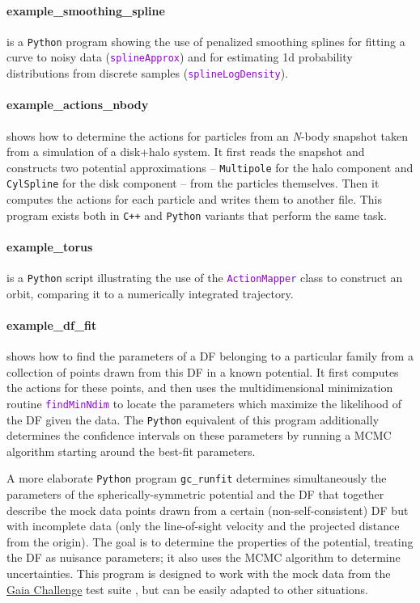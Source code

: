 \documentclass[12pt]{article}
\newcommand{\Nbody}{\textsl{N}-body\xspace}
\newcommand{\Cpp}  {\texttt{C++}\xspace}
\newcommand{\Python}{\texttt{Python}\xspace}
\newcommand{\ttt}[1]{\textcolor{darkviolet}{\texttt{#1}}}
\newcommand{\ppp}[1]{\textcolor{darkolive} {\texttt{#1}}}
\begin{document}
\paragraph{example_smoothing_spline} is a \Python program showing the use of penalized smoothing splines for fitting a curve to noisy data (\ttt{splineApprox}) and for estimating 1d probability distributions from discrete samples (\ttt{splineLogDensity}).

\paragraph{example_actions_nbody} shows how to determine the actions for particles from an \Nbody snapshot taken from a simulation of a disk+halo system. It first reads the snapshot and constructs two potential approximations -- \ppp{Multipole} for the halo component and \ppp{CylSpline} for the disk component -- from the particles themselves. Then it computes the actions for each particle and writes them to another file. This program exists both in \Cpp and \Python variants that perform the same task.

\paragraph{example_torus} is a \Python script illustrating the use of the \ttt{ActionMapper} class to construct an orbit, comparing it to a numerically integrated trajectory.

\paragraph{example_df_fit} shows how to find the parameters of a DF belonging to a particular family from a collection of points drawn from this DF in a known potential. It first computes the actions for these points, and then uses the multidimensional minimization routine \ttt{findMinNdim} to locate the parameters which maximize the likelihood of the DF given the data.
The \Python equivalent of this program additionally determines the confidence intervals on these parameters by running a MCMC algorithm starting around the best-fit parameters.

A more elaborate \Python program \texttt{gc_runfit} determines simultaneously the parameters of the spherically-symmetric potential and the DF that together describe the mock data points drawn from a certain (non-self-consistent) DF but with incomplete data (only the line-of-sight velocity and the projected distance from the origin). The goal is to determine the properties of the potential, treating the DF as nuisance parameters; it also uses the MCMC algorithm to determine uncertainties. 
This program is designed to work with the mock data from the \href{http://astrowiki.ph.surrey.ac.uk/dokuwiki/doku.php?id=tests:sphtri:spherical}{Gaia Challenge} test suite \cite{Read2021}, but can be easily adapted to other situations.
\end{document}
